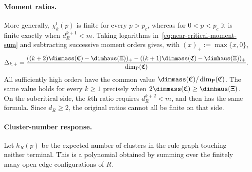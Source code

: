 \paragraph{Moment ratios.}
More generally, $\chi_k^{\mathrm f}(p)$ is finite for every $p>p_c$, whereas for $0<p<p_c$ it is finite exactly when $d_R^{k+1}<m$.
Taking logarithms in~\eqref{eq:near-critical-moment-sum} and subtracting successive moment orders gives, with $(x)_+:=\max\{x,0\}$,
\[
 \Delta_{k,+}=
 \frac{((k+2)\dimmass(\mathfrak C)-\dimhaus(\Xi))_+
 -((k+1)\dimmass(\mathfrak C)-\dimhaus(\Xi))_+}
 {\dim_{\mathrm P}(\mathfrak C)}.
\]
All sufficiently high orders have the common value $\dimmass(\mathfrak C)/\dim_{\mathrm P}(\mathfrak C)$.
The same value holds for every $k\ge1$ precisely when $2\dimmass(\mathfrak C)\ge\dimhaus(\Xi)$.
On the subcritical side, the $k$th ratio requires $d_R^{k+2}<m$, and then has the same formula.
Since $d_R\ge2$, the original ratios cannot all be finite on that side.

\paragraph{Cluster-number response.}
Let $h_R(p)$ be the expected number of clusters in the rule graph touching neither terminal.
This is a polynomial obtained by summing over the finitely many open-edge configurations of $R$.

